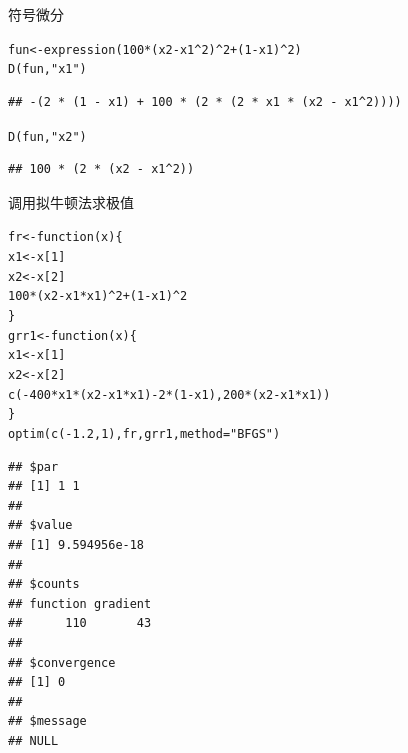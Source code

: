 \documentclass[a4paper]{ctexart}\usepackage[]{graphicx}\usepackage[]{color}
\makeatletter
\newcommand{\hlnum}[1]{\textcolor[rgb]{0.502,0.086,1}{#1}}%
\newcommand{\hlstr}[1]{\textcolor[rgb]{1,0.4,0.2}{#1}}%
\newcommand{\hlopt}[1]{\textcolor[rgb]{0.251,0.251,0.251}{#1}}%
\newcommand{\hlstd}[1]{\textcolor[rgb]{0.251,0.251,0.251}{#1}}%
\newcommand{\hlkwa}[1]{\textcolor[rgb]{0.941,0.188,0.816}{#1}}%
\newcommand{\hlkwb}[1]{\textcolor[rgb]{0,0.439,0.902}{#1}}%
\newcommand{\hlkwc}[1]{\textcolor[rgb]{0.188,0.941,0.314}{#1}}%
\newcommand{\hlkwd}[1]{\textcolor[rgb]{0.69,0.188,0.941}{#1}}%
\newenvironment{kframe}{%
 \def\at@end@of@kframe{}%
 \ifinner\ifhmode%
  \def\at@end@of@kframe{\end{minipage}}%
  \begin{minipage}{\columnwidth}%
 \fi\fi%
 \def\FrameCommand##1{\hskip\@totalleftmargin \hskip-\fboxsep
 \colorbox{shadecolor}{##1}\hskip-\fboxsep
     \hskip-\linewidth \hskip-\@totalleftmargin \hskip\columnwidth}%
 \MakeFramed {\advance\hsize-\width
   \@totalleftmargin\z@ \linewidth\hsize
   \@setminipage}}%
 {\par\unskip\endMakeFramed%
 \at@end@of@kframe}
\newenvironment{knitrout}{}{} %
\makeatother
\begin{document}
符号微分
\begin{knitrout}
\color{fgcolor}\begin{kframe}
\begin{alltt}
\hlstd{fun} \hlkwb{<-} \hlkwd{expression}\hlstd{(}\hlnum{100} \hlopt{*} \hlstd{(x2} \hlopt{-} \hlstd{x1}\hlopt{^}\hlnum{2}\hlstd{)}\hlopt{^}\hlnum{2} \hlopt{+} \hlstd{(}\hlnum{1} \hlopt{-} \hlstd{x1)}\hlopt{^}\hlnum{2}\hlstd{)}
\hlkwd{D}\hlstd{(fun,} \hlstr{"x1"}\hlstd{)}
\end{alltt}
\begin{verbatim}
## -(2 * (1 - x1) + 100 * (2 * (2 * x1 * (x2 - x1^2))))
\end{verbatim}
\begin{alltt}
\hlkwd{D}\hlstd{(fun,} \hlstr{"x2"}\hlstd{)}
\end{alltt}
\begin{verbatim}
## 100 * (2 * (x2 - x1^2))
\end{verbatim}
\end{kframe}
\end{knitrout}
调用拟牛顿法求极值
\begin{knitrout}
\color{fgcolor}\begin{kframe}
\begin{alltt}
\hlstd{fr} \hlkwb{<-} \hlkwa{function}\hlstd{(}\hlkwc{x}\hlstd{) \{}
    \hlstd{x1} \hlkwb{<-} \hlstd{x[}\hlnum{1}\hlstd{]}
    \hlstd{x2} \hlkwb{<-} \hlstd{x[}\hlnum{2}\hlstd{]}
    \hlnum{100} \hlopt{*} \hlstd{(x2} \hlopt{-} \hlstd{x1} \hlopt{*} \hlstd{x1)}\hlopt{^}\hlnum{2} \hlopt{+} \hlstd{(}\hlnum{1} \hlopt{-} \hlstd{x1)}\hlopt{^}\hlnum{2}
\hlstd{\}}
\hlstd{grr1} \hlkwb{<-} \hlkwa{function}\hlstd{(}\hlkwc{x}\hlstd{) \{}
    \hlstd{x1} \hlkwb{<-} \hlstd{x[}\hlnum{1}\hlstd{]}
    \hlstd{x2} \hlkwb{<-} \hlstd{x[}\hlnum{2}\hlstd{]}
    \hlkwd{c}\hlstd{(}\hlopt{-}\hlnum{400} \hlopt{*} \hlstd{x1} \hlopt{*} \hlstd{(x2} \hlopt{-} \hlstd{x1} \hlopt{*} \hlstd{x1)} \hlopt{-} \hlnum{2} \hlopt{*} \hlstd{(}\hlnum{1} \hlopt{-} \hlstd{x1),} \hlnum{200} \hlopt{*} \hlstd{(x2} \hlopt{-} \hlstd{x1} \hlopt{*} \hlstd{x1))}
\hlstd{\}}
\hlkwd{optim}\hlstd{(}\hlkwd{c}\hlstd{(}\hlopt{-}\hlnum{1.2}\hlstd{,} \hlnum{1}\hlstd{), fr, grr1,} \hlkwc{method} \hlstd{=} \hlstr{"BFGS"}\hlstd{)}
\end{alltt}
\begin{verbatim}
## $par
## [1] 1 1
## 
## $value
## [1] 9.594956e-18
## 
## $counts
## function gradient 
##      110       43 
## 
## $convergence
## [1] 0
## 
## $message
## NULL
\end{verbatim}
\end{kframe}
\end{knitrout}
\end{document}
